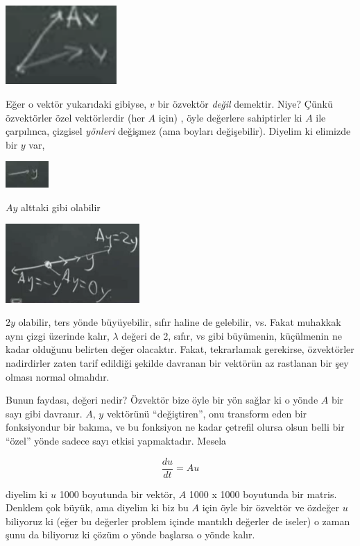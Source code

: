 \documentclass[12pt,fleqn]{article}\usepackage{../../common}
\begin{document}
\includegraphics[height=3cm]{5_2.png}

Eğer o vektör yukarıdaki gibiyse, $v$ bir özvektör {\em değil}
demektir. Niye? Çünkü özvektörler özel vektörlerdir (her $A$ için) , öyle
değerlere sahiptirler ki $A$ ile çarpılınca, çizgisel {\em yönleri}
değişmez (ama boyları değişebilir). Diyelim ki elimizde bir $y$ var,

\includegraphics[height=1cm]{5_3.png}

$Ay$ alttaki gibi olabilir

\includegraphics[height=3cm]{5_4.png}

$2y$ olabilir, ters yönde büyüyebilir, sıfır haline de gelebilir, vs. Fakat
muhakkak aynı çizgi üzerinde kalır, $\lambda$ değeri de 2, sıfır, vs gibi
büyümenin, küçülmenin ne kadar olduğunu belirten değer olacaktır. Fakat,
tekrarlamak gerekirse, özvektörler nadirdirler zaten tarif edildiği şekilde
davranan bir vektörün az rastlanan bir şey olması normal olmalıdır.

Bunun faydası, değeri nedir? Özvektör bize öyle bir yön sağlar ki o yönde
$A$ bir sayı gibi davranır. $A$, $y$ vektörünü ``değiştiren'', onu
transform eden bir fonksiyondur bir bakıma, ve bu fonksiyon ne kadar
çetrefil olursa olsun belli bir ``özel'' yönde sadece sayı etkisi
yapmaktadır. Mesela

$$ \frac{du}{dt} = Au $$

diyelim ki $u$ 1000 boyutunda bir vektör, $A$ 1000 x 1000 boyutunda bir
matris. Denklem çok büyük, ama diyelim ki biz bu $A$ için öyle bir özvektör
ve özdeğer $u$ biliyoruz ki (eğer bu değerler problem içinde mantıklı
değerler de iseler) o zaman şunu da biliyoruz ki çözüm o yönde başlarsa o
yönde kalır.
\end{document}
